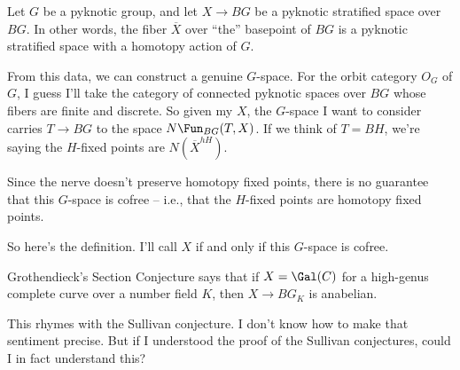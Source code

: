 
Let $G$ be a pyknotic group, and
let $X \to BG$ be a pyknotic stratified space over $BG$.
In other words, the fiber $\overline{X}$ over ``the'' basepoint of $BG$ is
a pyknotic stratified space with a homotopy action of $G$.

From this data, we can construct a genuine $G$-space.
For the orbit category $O_G$ of $G$, I guess I'll take%
the category of connected pyknotic spaces over $BG$ whose fibers are finite and discrete.
So given my $X$, the $G$-space I want to consider carries
$T \to BG$ to the space $N\Fun_{BG}(T, X)$.
If we think of $T=BH$, we're saying the $H$-fixed points are
$N(\overline{X}^{hH})$.

Since the nerve%
doesn't preserve homotopy fixed points,
there is no guarantee that this $G$-space is cofree --
i.e., that the $H$-fixed points are homotopy fixed points.%

So here's the definition.
I'll call $X$  if and only if this $G$-space is cofree.

Grothendieck's Section Conjecture says that
if $X=\Gal(C)$ for a high-genus complete curve over a number field $K$,
then $X \to BG_K$ is anabelian.

This rhymes with the Sullivan conjecture.
I don't know how to make that sentiment precise.
But if I understood the proof of the Sullivan conjectures,
could I in fact understand this?





